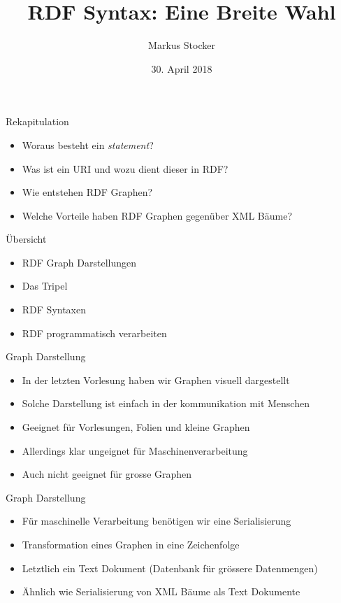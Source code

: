 \documentclass{beamer}
\title{RDF Syntax: Eine Breite Wahl}
\author{Markus Stocker}
\date{30. April 2018}
\begin{document}
\maketitle

\begin{frame}{Rekapitulation}
	
	\begin{itemize}
		\item Woraus besteht ein \emph{statement}?
		\item Was ist ein URI und wozu dient dieser in RDF?
		\item Wie entstehen RDF Graphen?
		\item Welche Vorteile haben RDF Graphen gegenüber XML Bäume?
	\end{itemize}
	
\end{frame}

\begin{frame}{Übersicht}
	
	\begin{itemize}
		\item RDF Graph Darstellungen
		\item Das Tripel
		\item RDF Syntaxen
		\item RDF programmatisch verarbeiten
	\end{itemize}
	
\end{frame}

\begin{frame}{Graph Darstellung}
	
	\begin{itemize}
		\item In der letzten Vorlesung haben wir Graphen visuell dargestellt
		\item Solche Darstellung ist einfach in der kommunikation mit Menschen
		\item Geeignet für Vorlesungen, Folien und kleine Graphen
		\item Allerdings klar ungeignet für Maschinenverarbeitung
		\item Auch nicht geeignet für grosse Graphen
	\end{itemize}
	
\end{frame}

\begin{frame}{Graph Darstellung}
	
	\begin{itemize}
		\item Für maschinelle Verarbeitung benötigen wir eine Serialisierung
		\item Transformation eines Graphen in eine Zeichenfolge
		\item Letztlich ein Text Dokument (Datenbank für grössere Datenmengen)
		\item Ähnlich wie Serialisierung von XML Bäume als Text Dokumente
	\end{itemize}
	
\end{frame}
\end{document}
